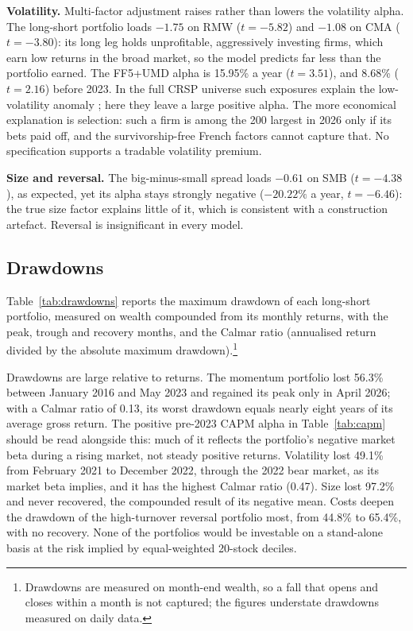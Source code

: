 \documentclass[11pt,a4paper]{article}
\newcommand{\tabfit}[1]{\resizebox{\textwidth}{!}{}}
\begin{document}
\textbf{Volatility.} Multi-factor adjustment raises rather than lowers the volatility alpha. The long-short portfolio loads $-1.75$ on RMW ($t = -5.82$) and $-1.08$ on CMA ($t = -3.80$): its long leg holds unprofitable, aggressively investing firms, which earn low returns in the broad market, so the model predicts far less than the portfolio earned. The FF5+UMD alpha is 15.95\% a year ($t = 3.51$), and 8.68\% ($t = 2.16$) before 2023. In the full CRSP universe such exposures explain the low-volatility anomaly \citep{fama2016}; here they leave a large positive alpha. The more economical explanation is selection: such a firm is among the 200 largest in 2026 only if its bets paid off, and the survivorship-free French factors cannot capture that. No specification supports a tradable volatility premium.

\textbf{Size and reversal.} The big-minus-small spread loads $-0.61$ on SMB ($t = -4.38$), as expected, yet its alpha stays strongly negative ($-20.22\%$ a year, $t = -6.46$): the true size factor explains little of it, which is consistent with a construction artefact. Reversal is insignificant in every model.

\subsection{Drawdowns}
\label{sec:drawdowns}

Table~\ref{tab:drawdowns} reports the maximum drawdown of each long-short portfolio, measured on wealth compounded from its monthly returns, with the peak, trough and recovery months, and the Calmar ratio (annualised return divided by the absolute maximum drawdown).\footnote{Drawdowns are measured on month-end wealth, so a fall that opens and closes within a month is not captured; the figures understate drawdowns measured on daily data.}

\begin{table}[!htbp]
\centering
\caption{Maximum drawdown (Max DD) of compounded monthly wealth and Calmar ratio (annualised arithmetic return divided by $|$Max DD$|$). Peak, trough and recovery months refer to the gross series; recovery is the first month in which wealth regains its pre-drawdown peak.}
\label{tab:drawdowns}
\small
\tabfit{tables/drawdowns}
\end{table}

Drawdowns are large relative to returns. The momentum portfolio lost 56.3\% between January 2016 and May 2023 and regained its peak only in April 2026; with a Calmar ratio of 0.13, its worst drawdown equals nearly eight years of its average gross return. The positive pre-2023 CAPM alpha in Table~\ref{tab:capm} should be read alongside this: much of it reflects the portfolio's negative market beta during a rising market, not steady positive returns. Volatility lost 49.1\% from February 2021 to December 2022, through the 2022 bear market, as its market beta implies, and it has the highest Calmar ratio (0.47). Size lost 97.2\% and never recovered, the compounded result of its negative mean. Costs deepen the drawdown of the high-turnover reversal portfolio most, from 44.8\% to 65.4\%, with no recovery. None of the portfolios would be investable on a stand-alone basis at the risk implied by equal-weighted 20-stock deciles.
\end{document}
